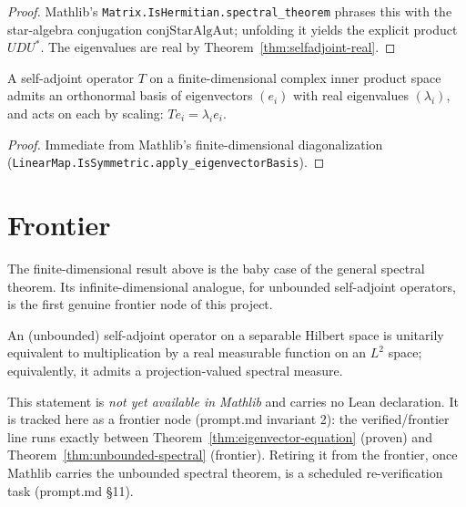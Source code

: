 \begin{proof}
  \leanok
  Mathlib's \texttt{Matrix.IsHermitian.spectral\_theorem} phrases this with the
  star-algebra conjugation $\mathrm{conjStarAlgAut}$; unfolding it yields the
  explicit product $U D U^{*}$. The eigenvalues are real by
  Theorem~\ref{thm:selfadjoint-real}.
\end{proof}

\begin{theorem}
  \label{thm:eigenvector-equation}
  \leanok
  A self-adjoint operator $T$ on a finite-dimensional complex inner product space
  admits an orthonormal basis of eigenvectors $(e_i)$ with real eigenvalues
  $(\lambda_i)$, and acts on each by scaling: $T e_i = \lambda_i e_i$.
\end{theorem}

\begin{proof}
  \leanok
  Immediate from Mathlib's finite-dimensional diagonalization
  (\texttt{LinearMap.IsSymmetric.apply\_eigenvectorBasis}).
\end{proof}

\section{Frontier}

The finite-dimensional result above is the baby case of the general spectral
theorem. Its infinite-dimensional analogue, for unbounded self-adjoint operators,
is the first genuine frontier node of this project.

\begin{theorem}
  \label{thm:unbounded-spectral}
  \notready
  An (unbounded) self-adjoint operator on a separable Hilbert space is unitarily
  equivalent to multiplication by a real measurable function on an
  $L^2$ space; equivalently, it admits a projection-valued spectral measure.
\end{theorem}

\begin{remark}
  This statement is \emph{not yet available in Mathlib} and carries no Lean
  declaration. It is tracked here as a frontier node (prompt.md invariant 2): the
  verified/frontier line runs exactly between
  Theorem~\ref{thm:eigenvector-equation} (proven) and
  Theorem~\ref{thm:unbounded-spectral} (frontier). Retiring it from the frontier,
  once Mathlib carries the unbounded spectral theorem, is a scheduled
  re-verification task (prompt.md \S11).
\end{remark}


